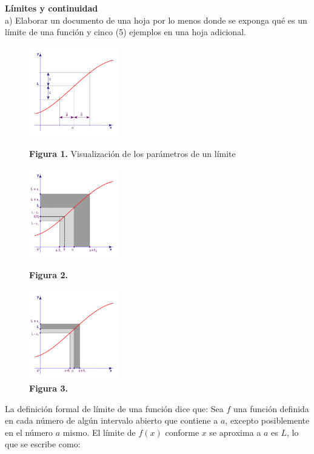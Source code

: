 \documentclass[11pt]{report}
\begin{document}
\pagebreak \textbf {Límites y continuidad}\\[2mm]
a) Elaborar un documento de una hoja por lo menos donde se exponga qué es un límite de una función y cinco (5) ejemplos en una hoja adicional.
\begin{figure}
\includegraphics[width=0.35\textwidth]{lim}
\caption*{\textbf{Figura 1.} Visualización de los parámetros de un límite}
\label{figu:mesh1}
\includegraphics[width=0.35\textwidth]{lim2}
\caption*{\textbf{Figura 2.}}
\label{figu:mesh2}
\includegraphics[width=0.35\textwidth]{lim3}
\caption*{\textbf{Figura 3.}}
\label{figu:mesh3}
\end{figure}

\hspace*{10mm}La definición formal de límite de una función dice que: Sea $f$ una función definida en cada número de algún intervalo abierto que contiene a $a$, excepto posiblemente en el número $a$ mismo. El límite de $f(x)$ conforme $x$ se aproxima a $a$ es $L$, lo que se escribe como:
\end{document}
